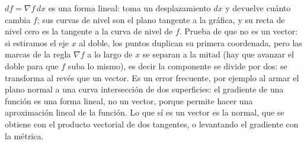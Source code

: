 \begin{atencion}
\(df=\nabla f\,dx\) es una forma lineal: toma un desplazamiento \(dx\) y devuelve cuánto
cambia \(f\); sus curvas de nivel son el plano tangente a la gráfica, y su recta de nivel
cero es la tangente a la curva de nivel de \(f\). Prueba de que no es un vector: si
estiramos el eje \(x\) al doble, los puntos duplican su primera coordenada, pero las marcas
de la regla \(\nabla f\) a lo largo de \(x\) se separan a la mitad (hay que avanzar el
doble para que \(f\) suba lo mismo), es decir la componente se divide por dos: se
transforma al revés que un vector. Es un error frecuente, por ejemplo al armar el plano normal a una curva
intersección de dos superficies: el gradiente de una función es una forma lineal, no un
vector, porque permite hacer una aproximación lineal de la función. Lo que sí es un vector es la normal, que se obtiene con el producto
vectorial de dos tangentes, o levantando el gradiente con la métrica.
\end{atencion}


